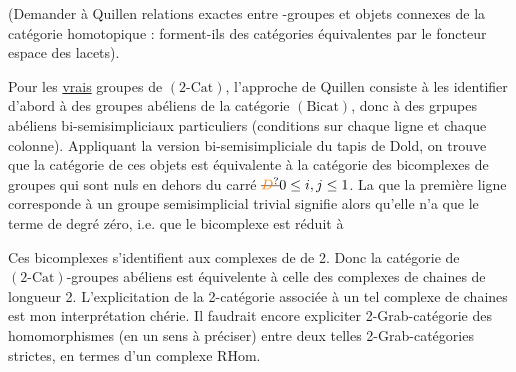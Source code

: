 \margin{\handwritten{\(\Vert\)}}%
(Demander à Quillen relations exactes entre -groupes et objets  connexes de la catégorie homotopique : forment-ils des catégories équivalentes par le foncteur espace des lacets).

Pour les \uline{vrais} groupes  de $(2\text{-}\mathrm{Cat})$, l'approche de Quillen consiste à les identifier d'abord à des groupes abéliens de la catégorie $(\mathrm{Bicat})$, donc à des grpupes abéliens bi-semisimpliciaux particuliers (conditions sur chaque ligne et chaque colonne). Appliquant la version bi-semisimpliciale du tapis de Dold, on trouve que  la catégorie de ces objets est équivalente à la catégorie des  bicomplexes  de groupes  qui sont nuls en dehors du carré $\deleted{\unsure{D}}0\handwritten{\leq}i,j\handwritten{\leq}1$.  La  que la première ligne corresponde à un  groupe semisimplicial trivial signifie alors qu'elle n'a que le terme de degré zéro, i.e. que le bicomplexe est réduit à



Ces bicomplexes s'identifient aux complexes de  de  2. Donc la catégorie de $(2\text{-}\mathrm{Cat})$-groupes abéliens est équivelente à celle des complexes de chaines de longueur 2. L'explicitation de la 2-catégorie associée à un tel complexe de chaines est mon interprétation chérie. Il faudrait encore expliciter  2-Grab-catégorie des homomorphismes (en un sens à préciser) entre deux telles 2-Grab-catégories strictes, en termes d'un complexe $\mathrm{RHom}$.

